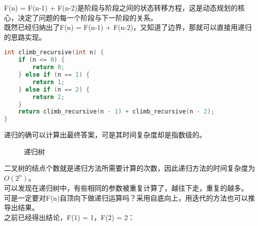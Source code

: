 F(n) = F(n-1) + F(n-2)是阶段与阶段之间的状态转移方程，这是动态规划的核心，决定了问题的每一个阶段与下一阶段的关系。\\

既然已经归纳出了F(n) = F(n-1) + F(n-2)，又知道了边界，那就可以直接用递归的思路实现。\\


\begin{lstlisting}[language=C]
int climb_recursive(int n) {
	if (n <= 0) {
		return 0;
	} else if (n == 1) {
		return 1;
	} else if (n == 2) {
		return 2;
	}
	return climb_recursive(n - 1) + climb_recursive(n - 2);
}
\end{lstlisting}

递归的确可以计算出最终答案，可是其时间复杂度却是指数级的。

\begin{figure}[H]
	\centering
	\caption{递归树}
\end{figure}

二叉树的结点个数就是递归方法所需要计算的次数，因此递归方法的时间复杂度为$ O(2^n) $。\\

可以发现在递归树中，有些相同的参数被重复计算了，越往下走，重复的越多。\\

可是一定要对F(n)自顶向下做递归运算吗？采用自底向上，用迭代的方法也可以推导出结果。\\

之前已经得出结论，F(1) = 1，F(2) = 2：

\begin{table}[H]
	\centering
\end{table}

